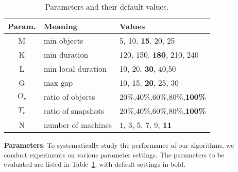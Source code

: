 \begin{table}[h]
\begin{tabular}{c|l|p{3.3cm}}
\hline 
\textbf{Param.} & \textbf{Meaning} & \textbf{Values} \\ 
\hline 
M & min  objects &  5, 10,  \textbf{15}, 20, 25 \\ 
\hline 
K & min duration & 120, 150, \textbf{180}, 210, 240 \\ 
\hline 
L & min local duration & 10, 20, \textbf{30}, 40,50 \\ 
\hline 
G & max gap & 10, 15, \textbf{20}, 25, 30 \\ 
\hline
$O_r$ & ratio of objects & 20\%,40\%,60\%,80\%,\textbf{100\%} \\ \hline
$T_r$ & ratio of snapshots & 20\%,40\%,60\%,80\%,\textbf{100\%} \\ \hline
N & number of machines & 1, 3, 5, 7, 9, \textbf{11}\\ 
\hline 
\end{tabular} 
\caption{Parameters and their default values.}
\label{tbl:parameters}
\end{table}



\textbf{Parameters}: To systematically study the performance of
our algorithms, we conduct experiments on various parameter settings. The parameters to be evaluated are listed in Table~\ref{tbl:parameters}, with default settings in bold. 

